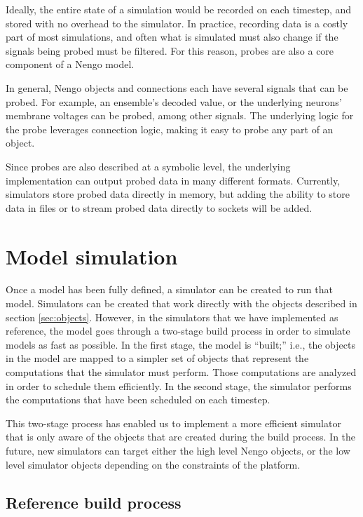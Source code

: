 \documentclass{frontiersSCNS}
\begin{document}
Ideally, the entire state of a simulation
would be recorded on each timestep,
and stored with no overhead to the simulator.
In practice, recording data
is a costly part of most simulations,
and often what is simulated must also change
if the signals being probed must be filtered.
For this reason, probes are also
a core component of a Nengo model.

In general, Nengo objects and connections
each have several signals that can be probed.
For example, an ensemble's decoded value,
or the underlying neurons' membrane voltages
can be probed, among other signals.
The underlying logic for the probe
leverages connection logic,
making it easy to probe any part of an object.

Since probes are also described
at a symbolic level,
the underlying implementation
can output probed data in many different formats.
Currently, simulators store probed data
directly in memory,
but adding the ability to store data
in files or to stream probed data
directly to sockets will be added.

\section{Model simulation} \label{sec:simulators}

Once a model has been fully defined,
a simulator can be created to
run that model.
Simulators can be created
that work directly with the
objects described in section \ref{sec:objects}.
However, in the simulators that we have implemented
as reference, the model goes through a
two-stage build process in order to
simulate models as fast as possible.
In the first stage,
the model is ``built;''
i.e., the objects in the model are mapped to a simpler
set of objects that represent the computations
that the simulator must perform.
Those computations are analyzed in order to
schedule them efficiently.
In the second stage,
the simulator performs the computations
that have been scheduled on each timestep.

This two-stage process has enabled us
to implement a more efficient simulator
that is only aware of
the objects that are created
during the build process.
In the future,
new simulators can target either
the high level Nengo objects,
or the low level simulator objects
depending on the constraints of the platform.

\subsection{Reference build process}
\end{document}
